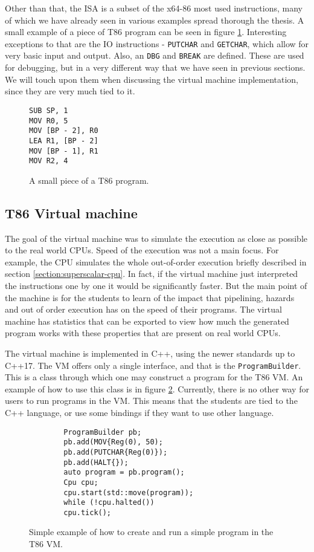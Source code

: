 Other than that, the ISA is a subset of the x64-86 most used instructions, many
of which we have already seen in various examples spread thorough the thesis. A
small example of a piece of T86 program can be seen in figure
\ref{fig:t86-example}. Interesting exceptions to that are the IO instructions -
\texttt{PUTCHAR} and \texttt{GETCHAR}, which allow for very basic input and
output. Also, an \texttt{DBG} and \texttt{BREAK} are defined. These are used
for debugging, but in a very different way that we have seen in previous
sections. We will touch upon them when discussing the virtual machine
implementation, since they are very much tied to it.

\begin{figure}
    \begin{lstlisting}
SUB SP, 1
MOV R0, 5
MOV [BP - 2], R0
LEA R1, [BP - 2]
MOV [BP - 1], R1
MOV R2, 4
    \end{lstlisting}
    \caption{A small piece of a T86 program.}
    \label{fig:t86-example}
\end{figure}

\subsection{T86 Virtual machine}
The goal of the virtual machine was to simulate the execution as close as
possible to the real world CPUs. Speed of the execution was not a main focus.
For example, the CPU simulates the whole out-of-order execution briefly
described in section \ref{section:superscalar-cpu}. In fact, if the virtual
machine just interpreted the instructions one by one it would be significantly
faster. But the main point of the machine is for the students to learn of the
impact that pipelining, hazards and out of order execution has on the speed of
their programs. The virtual machine has statistics that can be exported to view
how much the generated program works with these properties that are present on
real world CPUs.

The virtual machine is implemented in C++, using the newer standards up to
C++17. The VM offers only a single interface, and that is the
\texttt{ProgramBuilder}. This is a class through which one may construct a
program for the T86 VM. An example of how to use this class is in figure
\ref{fig:t86-intro}. Currently, there is no other way for users to run programs
in the VM. This means that the students are tied to the C++ language, or use
some bindings if they want to use other language.

\begin{figure}
    \begin{verbatim}
        ProgramBuilder pb;
        pb.add(MOV{Reg(0), 50);
        pb.add(PUTCHAR{Reg(0)});
        pb.add(HALT{});
        auto program = pb.program();
        Cpu cpu;
        cpu.start(std::move(program));
        while (!cpu.halted())
        cpu.tick();
    \end{verbatim}
    \caption{Simple example of how to create and run a simple program in the T86 VM.}
    \label{fig:t86-intro}
\end{figure}


